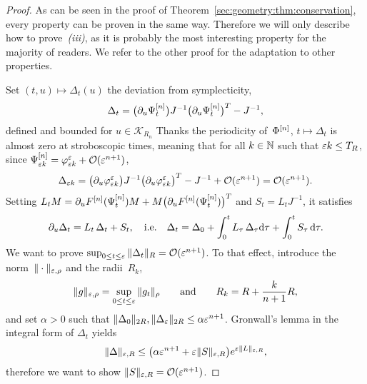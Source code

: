 \begin{proof}
As can be seen in the proof of
Theorem~\ref{sec:geometry:thm:conservation}, every property can be proven
in the same way. Therefore we will only describe how to
prove~\textit{(iii)}, as it is probably the most interesting property for
the majority of readers. We refer to the other proof for the adaptation to
other properties. 

Set $(t,u) \mapsto \Delta_t(u)$ the deviation from symplecticity, 
\begin{equation*}
  \Delta_t = \big(\partial_u \Psi_t^{[n]}\big) J^{-1} 
      \big( \partial_u \Psi_t^{[n]} \big) ^T 
    - J^{-1} ,
\end{equation*}
defined and bounded for $u \in \mathcal{K}_{R_n}$ 
Thanks the periodicity of~$\Phi^{[n]}$, $t \mapsto \Delta_t$ is almost zero at
stroboscopic times, meaning that for all $k \in \mathbb{N}$ such that $\varepsilon k \leq
T_R$, since $\Psi^{[n]} _{\varepsilon k} = \varphi^{\varepsilon} _{\varepsilon k} + \mathcal{O}(
\varepsilon^{n+1})$,
\begin{equation*}
  \Delta_{\varepsilon k} 
  = \big(\partial_u \varphi ^{\varepsilon} _{\varepsilon k}\big) J^{-1} 
      \big( \partial_u \varphi^{\varepsilon} _{\varepsilon k} \big) ^T 
    - J^{-1} + \mathcal{O}( \varepsilon^{n+1} )
  = \mathcal{O}( \varepsilon^{n+1} ) .
\end{equation*}
Setting $L_t M = \partial_u F^{[n]} ( \Psi_t^{[n]} ) M + M \big( \partial_u F^{[n]}
(\Psi_t^{[n]} ) \big)^T $ and $S_t = L_t J^{-1}$, it satisfies
\begin{equation} \label{sec:approx:eq:ode_R}
  \partial_u \Delta_t = L_t\, \Delta_t + S_t,
  \quad\text{i.e.}\quad
  \Delta_t = \Delta_0 + \int_0^t L_\tau\, \Delta_\tau \mathrm{d} \tau 
    + \int_0^t S_\tau \, \mathrm{d} \tau .
\end{equation}
We want to prove $\sup_{0 \leq t \leq \varepsilon} \| \Delta_t \|_R = \mathcal{O}(\varepsilon^{n+1}
)$. To that effect, introduce the norm~$\|\cdot\|_{\varepsilon, \rho}$ and the
radii~$R_k$, 
\begin{equation*}
  \| g \|_{\varepsilon, \rho} = \sup_{0 \leq t \leq \varepsilon} \| g_{t} \|_{\rho}
  \qquad\text{and}\qquad
  R_k = R + \frac{k}{n+1}R ,
\end{equation*}
and set $\alpha > 0$ such that $\| \Delta_0 \|_{2R}, \| \Delta_{\varepsilon}
\|_{2R} \leq \alpha \varepsilon^{n+1}$. Gronwall's lemma in the integral form of
$\Delta_t$ yields 
\begin{equation} \label{sec:approx:eq:gronwall}
  \| \Delta \|_{\varepsilon, R} 
  \leq \big( \alpha \varepsilon^{n+1} + \varepsilon \| S \|_{\varepsilon, R} \big)
    e^{\varepsilon \| L \|_{\varepsilon, R}} ,
\end{equation}
therefore we want to show $\| S \|_{\varepsilon, R} = \mathcal{O}( \varepsilon^{n+1} )$.

\end{proof}
